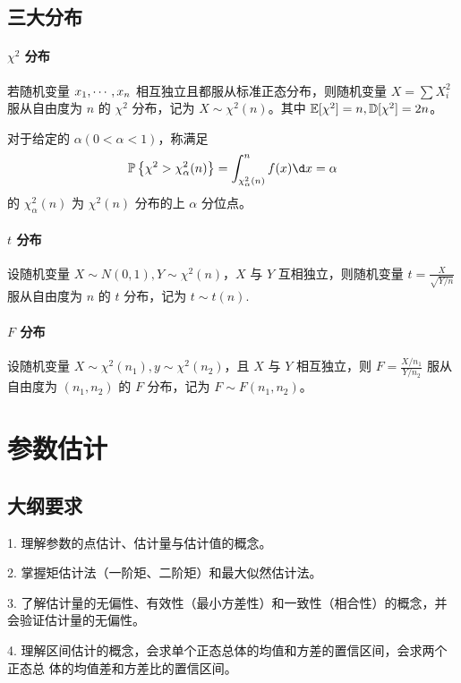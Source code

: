 \subsection{三大分布}

\paragraph{$\chi^2$ 分布}

若随机变量 $x_1,\cdots,x_n$ 相互独立且都服从标准正态分布，则随机变量 $X = \sum X_i^2$ 服从自由度为 $n$ 的 $\chi^2$ 分布，记为 $X \sim \chi^2(n)$。其中 $\mathbb{E}[\chi^2] = n, \mathbb{D}[\chi^2] = 2n$。

对于给定的 $\alpha(0 < \alpha < 1)$，称满足
\[ \bbP\left\{\chi^2 > \chi_\alpha^2(n)\right\} = \int_{\chi_\alpha^2(n)}^n f(x) \d x = \alpha  \]
的 $\chi_\alpha^2(n)$ 为 $\chi^2(n)$ 分布的上 $\alpha$ 分位点。

\paragraph{$t$ 分布}

设随机变量 $X \sim N(0, 1), Y \sim \chi^2(n)$，$X$ 与 $Y$ 互相独立，则随机变量 $t = \frac{X}{\sqrt{Y / n}}$ 服从自由度为 $n$ 的 $t$ 分布，记为 $t \sim t(n)$.

\paragraph{$F$ 分布}

设随机变量 $X \sim \chi^2(n_1), y \sim \chi^2(n_2)$，且 $X$ 与 $Y$ 相互独立，则 $F = \frac{X / n_1}{Y / n_2}$ 服从自由度为 $(n_1, n_2)$ 的 $F$ 分布，记为 $F \sim F(n_1, n_2)$。


\section{参数估计}

\subsection{大纲要求}

1. 理解参数的点估计、估计量与估计值的概念。

2. 掌握矩估计法（一阶矩、二阶矩）和最大似然估计法。

3. 了解估计量的无偏性、有效性（最小方差性）和一致性（相合性）的概念，并会验证估计量的无偏性。

4. 理解区间估计的概念，会求单个正态总体的均值和方差的置信区间，会求两个正态总
体的均值差和方差比的置信区间。

